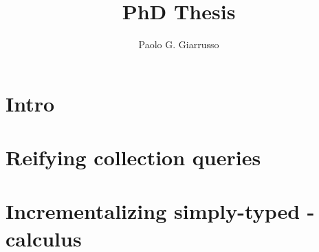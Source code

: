 \documentclass{book}
\title{PhD Thesis}
\author{Paolo G. Giarrusso}
\begin{document}
\maketitle
\chapter{Intro}
\chapter{Reifying collection queries}





\newcommand{\co}[1]{\code{#1}} %
\chapter{Incrementalizing simply-typed \TitleLambda{}-calculus}
















\begin{oldSec}

\end{oldSec}

\begin{oldSec}

\end{oldSec}




\end{document}
